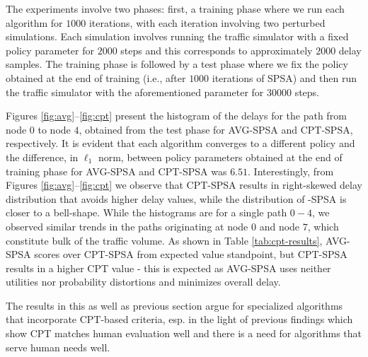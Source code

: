  
The experiments involve two phases:
first, a training phase where we run each algorithm for $1000$ iterations, with each iteration involving two perturbed simulations. Each simulation involves running the traffic simulator with a fixed policy parameter for $2000$ steps and this corresponds to approximately $2000$ delay samples. The training phase is followed by a test phase where we fix the policy obtained at the end of training (i.e., after $1000$ iterations of SPSA) and then run the traffic simulator with the aforementioned parameter for $30000$ steps. 


Figures \ref{fig:avg}--\ref{fig:cpt} present the histogram of the delays for the path from node $0$ to node $4$, obtained from the test phase for AVG-SPSA and CPT-SPSA, respectively.  
It is evident that each algorithm converges to a different policy and the difference, in $\ell_1$ norm, between policy parameters obtained at the end of training phase for AVG-SPSA and CPT-SPSA was $6.51$. 
Interestingly, from Figures \ref{fig:avg}--\ref{fig:cpt} we observe that CPT-SPSA results in right-skewed delay distribution that avoids higher delay values, while the distribution of -SPSA is closer to a bell-shape. While the histograms are for a single path $0-4$, we observed similar trends in the paths originating at node $0$ and node $7$, which constitute bulk of the traffic volume. As shown in Table \ref{tab:cpt-results}, AVG-SPSA scores over CPT-SPSA from expected value standpoint, but CPT-SPSA results in a higher CPT value - this is expected as AVG-SPSA uses neither utilities nor probability distortions and minimizes overall delay.

The results in this as well as previous section argue for specialized algorithms that incorporate CPT-based criteria, esp. in the light of previous findings which show CPT matches human evaluation well and there is a need for algorithms that serve human needs well.

